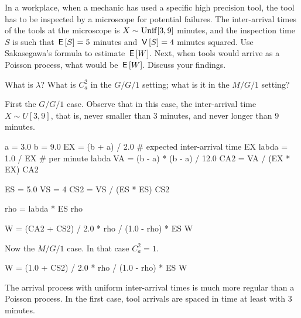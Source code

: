 \documentclass[stochastic-or.tex]{subfiles}
\begin{document}
\begin{exercise}\label{ex:91}
In a workplace, when a mechanic has used a specific high precision tool, the tool has to be inspected by a microscope for potential failures.
The inter-arrival times of the tools at the microscope is $X\sim \mathrm{Unif}[3, 9]$ minutes, and the inspection time~$S$ is such that $\,\mathsf{E}\left[S\right] = 5$ minutes and $\,\mathsf{V}\left[S\right] = 4$ minutes squared.
Use Sakasegawa's formula to estimate $\,\mathsf{E}\left[W\right]$.
Next, when tools would arrive as a Poisson process, what would be $\,\mathsf{E}\left[W\right]$.
Discuss your findings.
\begin{hint}
  What is $\lambda$? What is $C_a^2$ in the $G/G/1$ setting; what is it in the $M/G/1$ setting?
\end{hint}

\begin{solution}
First the $G/G/1$ case. Observe that in this case, the inter-arrival time $X\sim U[3,9]$, that is, never smaller than 3 minutes, and never longer than 9 minutes.

\begin{pyconsole}
a = 3.0
b = 9.0
EX = (b + a) / 2.0  # expected inter-arrival time
EX
labda = 1.0 / EX  # per minute
labda
VA = (b - a) * (b - a) / 12.0
CA2 = VA / (EX * EX)
CA2

ES = 5.0
VS = 4
CS2 = VS / (ES * ES)
CS2

rho = labda * ES
rho

W = (CA2 + CS2) / 2.0 * rho / (1.0 - rho) * ES
W
\end{pyconsole}

Now the $M/G/1$ case. In that case $C_a^2=1$.
\begin{pyconsole}
W = (1.0 + CS2) / 2.0 * rho / (1.0 - rho) * ES
W
\end{pyconsole}

The arrival process with uniform inter-arrival times is much more regular than a Poisson process.
In the first case, tool arrivals are spaced in time at least with 3 minutes.
\end{solution}
\end{exercise}


\end{document}
